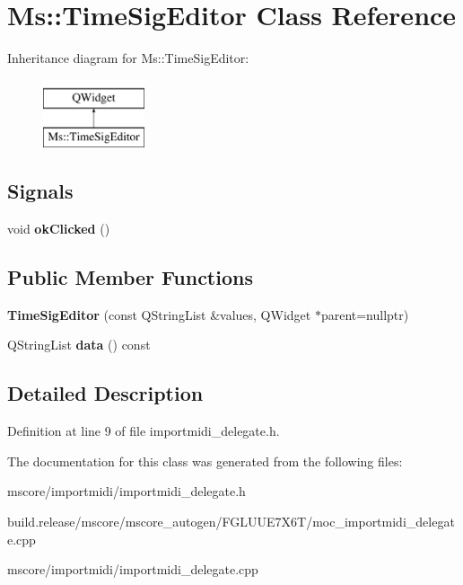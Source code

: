 \hypertarget{class_ms_1_1_time_sig_editor}{}\section{Ms\+:\+:Time\+Sig\+Editor Class Reference}
\label{class_ms_1_1_time_sig_editor}
Inheritance diagram for Ms\+:\+:Time\+Sig\+Editor\+:\begin{figure}[H]
\begin{center}
\leavevmode
\includegraphics[height=2.000000cm]{class_ms_1_1_time_sig_editor}
\end{center}
\end{figure}
\subsection*{Signals}
\begin{DoxyCompactItemize}
\item 
\mbox{\label{class_ms_1_1_time_sig_editor_ac54fc38de8e2517f8976ca3376c62b53}} 
void {\bfseries ok\+Clicked} ()
\end{DoxyCompactItemize}
\subsection*{Public Member Functions}
\begin{DoxyCompactItemize}
\item 
\mbox{\label{class_ms_1_1_time_sig_editor_a90bd4a9649f75ce882462c95d259d2eb}} 
{\bfseries Time\+Sig\+Editor} (const Q\+String\+List \&values, Q\+Widget $\ast$parent=nullptr)
\item 
\mbox{\label{class_ms_1_1_time_sig_editor_a32052ed473a95b4eab4e79a41ca1acc4}} 
Q\+String\+List {\bfseries data} () const
\end{DoxyCompactItemize}


\subsection{Detailed Description}


Definition at line 9 of file importmidi\+\_\+delegate.\+h.



The documentation for this class was generated from the following files\+:\begin{DoxyCompactItemize}
\item 
mscore/importmidi/importmidi\+\_\+delegate.\+h\item 
build.\+release/mscore/mscore\+\_\+autogen/\+F\+G\+L\+U\+U\+E7\+X6\+T/moc\+\_\+importmidi\+\_\+delegate.\+cpp\item 
mscore/importmidi/importmidi\+\_\+delegate.\+cpp\end{DoxyCompactItemize}
